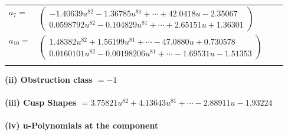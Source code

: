 \documentclass[1p]{elsarticle_modified}
\theoremstyle{definition}
\begin{document}
\begin{tabular}{m{7pt} m{180pt} m{7pt} m{180pt} }
\flushright $a_{7}=$&$\begin{pmatrix}-1.40639 u^{82}-1.36785 u^{81}+\cdots+42.0418 u-2.35067\\0.0598792 u^{82}-0.104829 u^{81}+\cdots+2.65151 u+1.36301\end{pmatrix}$ \\
\flushright $a_{10}=$&$\begin{pmatrix}1.48382 u^{82}+1.56199 u^{81}+\cdots-47.0880 u+0.730578\\0.0160101 u^{82}-0.00198206 u^{81}+\cdots-1.69531 u-1.51353\end{pmatrix}$\\&\end{tabular}
\flushleft \textbf{(ii) Obstruction class $= -1$}\\~\\
\flushleft \textbf{(iii) Cusp Shapes $= 3.75821 u^{82}+4.13643 u^{81}+\cdots-2.88911 u-1.93224$}\\~\\
\newpage\renewcommand{\arraystretch}{1}
\flushleft \textbf{(iv) u-Polynomials at the component}\newline \\
\end{document}
